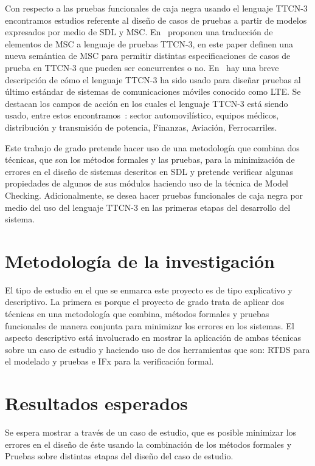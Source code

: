Con respecto a las pruebas funcionales de caja negra usando el lenguaje TTCN-3 encontramos estudios referente al diseño de casos de pruebas a partir de modelos expresados por medio de SDL y MSC. En~\cite{Ebner} proponen una traducci\'on de elementos de MSC a lenguaje de pruebas TTCN-3, en este paper definen una nueva sem\'antica de MSC para permitir distintas especificaciones de casos de prueba en TTCN-3 que pueden ser concurrentes o no. En~\cite{Willcock2011} hay una breve descripci\'on de c\'omo el lenguaje TTCN-3 ha sido usado para diseñar pruebas al \'ultimo est\'andar de sistemas de comunicaciones m\'oviles conocido como LTE. Se destacan los campos de acci\'on en los cuales el lenguaje TTCN-3 est\'a siendo usado, entre estos encontramos~\cite{Schieferdecker}: sector automovil\'istico,  equipos m\'edicos, distribuci\'on y transmisi\'on de potencia, Finanzas, Aviaci\'on, Ferrocarriles.

Este trabajo de grado pretende hacer uso de una metodolog\'ia que combina dos t\'ecnicas, que son los m\'etodos formales y las pruebas, para la minimizaci\'on de errores en el diseño de sistemas descritos en SDL y pretende verificar algunas propiedades de algunos de sus m\'odulos haciendo uso de la t\'ecnica de Model Checking. Adicionalmente, se desea hacer pruebas funcionales de caja negra por medio del uso del lenguaje TTCN-3 en las primeras etapas del desarrollo del sistema.
 


\section{Metodolog\'ia de la investigaci\'on}

El tipo de estudio en el que se enmarca este proyecto es de tipo explicativo y 
descriptivo. La primera es porque el proyecto de grado trata de aplicar dos 
t\'ecnicas en una metodolog\'ia que combina, m\'etodos formales y pruebas funcionales de manera conjunta 
para minimizar los errores en los sistemas. El aspecto descriptivo est\'a 
involucrado en mostrar la aplicaci\'on de ambas t\'ecnicas sobre un caso de 
estudio y haciendo uso de dos herramientas que son: RTDS para el modelado y 
pruebas e IFx para la verificaci\'on formal.

\section{Resultados esperados}

Se espera mostrar a trav\'es de un caso de estudio, que es posible minimizar los 
errores en el dise\~no de \'este usando la combinaci\'on de los m\'etodos 
formales y Pruebas sobre distintas etapas del dise\~no del caso de estudio.

